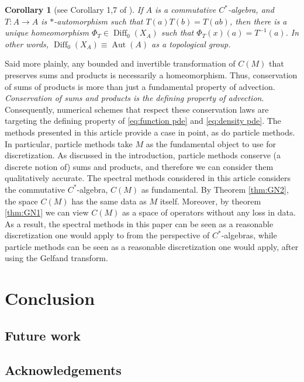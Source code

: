 \documentclass[12pt]{amsart}
\newtheorem{cor}[thm]{Corollary}
\DeclareMathOperator{\Diff}{Diff}
\begin{document}
\begin{cor}[see Corollary 1,7 of \cite{Bondia2001}]
	If $A$ is a commutative $C^{*}$-algebra, and $T:A\to A$ is $*$-automorphism such that $T(a)T(b) = T(ab)$,
	then there is a unique homeomorphism $\Phi_{T} \in \Diff_{0}(X_{A})$
	such that $\Phi_{T}(x) (a) = T^{-1}(a)$.
	In other words, $\Diff_{0}(X_{A}) \equiv \operatorname{Aut}(A)$ as a topological group.
\end{cor}

Said more plainly, any bounded and invertible transformation of $C(M)$ that preserves sums and products is necessarily a homeomorphism.
Thus, conservation of sums of products is more than just a fundamental property of advection.
\emph{Conservation of sums and products is the defining property of advection}.
Consequently, numerical schemes that respect these conservation laws are targeting the defining property of \eqref{eq:function pde} and \eqref{eq:density pde}.
The methods presented in this article provide a case in point, as do particle methods.
In particular, particle methods take $M$ as the fundamental object to use for discretization.
As discussed in the introduction, particle methods conserve (a discrete notion of) sums and products, and therefore we can consider them qualitatively accurate.
The spectral methods considered in this article considers the commutative $C^{*}$-algebra, $C(M)$ as fundamental.
By Theorem \ref{thm:GN2}, the space $C(M)$ has the same data as $M$ itself.
Moreover, by theorem \ref{thm:GN1} we can view $C(M)$ as a space of operators without any loss in data.
As a result, the spectral methods in this paper can be seen as a reasonable discretization one would apply to from the perspective of $C^{*}$-algebras,
while particle methods can be seen as a reasonable discretization one would apply, after using the Gelfand transform.


\section{Conclusion}

\subsection{Future work}


\subsection{Acknowledgements}
\end{document}
